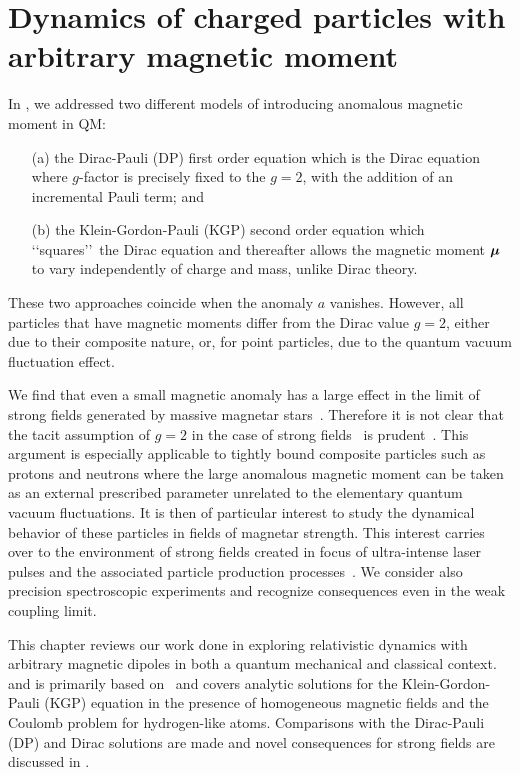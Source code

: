 \chapter{Dynamics of charged particles with arbitrary magnetic moment}
\label{chap:moment}
\noindent In , we addressed two different models of introducing anomalous magnetic moment in QM: 
\begin{enumerate}
\item[(a)] the Dirac-Pauli (DP) first order equation which is the Dirac equation where $g$-factor is precisely fixed to the $g\!=\!2$, with the addition of an incremental Pauli term; and
\item[(b)] the Klein-Gordon-Pauli (KGP) second order equation which \lq\lq squares\rq\rq\ the Dirac equation and thereafter allows the magnetic moment $\boldsymbol{\mu}$ to vary independently of charge and mass, unlike Dirac theory.
\end{enumerate} 
These two approaches coincide when the anomaly $a$ vanishes. However, all particles that have magnetic moments differ from the Dirac value $g\!=\!2$, either due to their composite nature, or, for point particles, due to the quantum vacuum fluctuation effect.

We find that even a small magnetic anomaly has a large effect in the limit of strong fields generated by massive magnetar stars~\citep{Kaspi:2017fwg}. Therefore it is not clear that the tacit assumption of $g\!=\!2$ in the case of strong fields~\citep{Rafelski:1976ts,Greiner:1985ce,Rafelski:2016ixr} is prudent~\citep{Evans:2018kor}. This argument is especially applicable to tightly bound composite particles such as protons and neutrons where the large anomalous magnetic moment can be taken as an external prescribed parameter unrelated to the elementary quantum vacuum fluctuations. It is then of particular interest to study the dynamical behavior of these particles in fields of magnetar strength. This interest carries over to the environment of strong fields created in focus of ultra-intense laser pulses and the associated particle production processes~\citep{Dunne:2014qda,Hegelich:2014tda}. We consider also precision spectroscopic experiments and recognize consequences even in the weak coupling limit.

This chapter reviews our work done in exploring relativistic dynamics with arbitrary magnetic dipoles in both a quantum mechanical and classical context.  and  is primarily based on~\cite{Steinmetz:2018ryf} and covers analytic solutions for the Klein-Gordon-Pauli (KGP) equation in the presence of homogeneous magnetic fields and the Coulomb problem for hydrogen-like atoms. Comparisons with the Dirac-Pauli (DP) and Dirac solutions are made and novel consequences for strong fields are discussed in .

